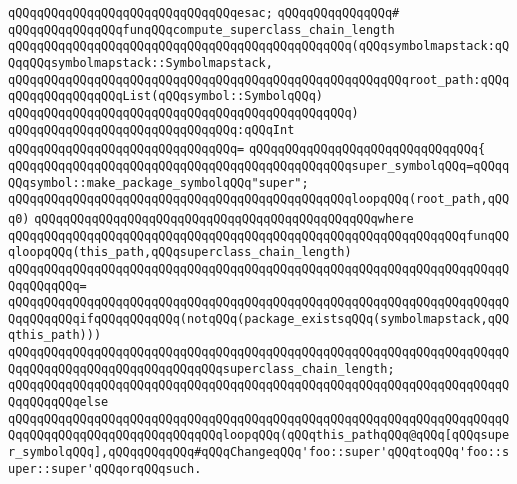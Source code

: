 \verb|qQQqqQQqqQQqqQQqqQQqqQQqqQQqqQQqesac;|\newline
\newline
\verb|qQQqqQQqqQQqqQQq#|\newline
\verb|qQQqqQQqqQQqqQQqfunqQQqcompute_superclass_chain_length|\newline
\verb|qQQqqQQqqQQqqQQqqQQqqQQqqQQqqQQqqQQqqQQqqQQqqQQq(qQQqsymbolmapstack:qQQqqQQqsymbolmapstack::Symbolmapstack,|\newline
\verb|qQQqqQQqqQQqqQQqqQQqqQQqqQQqqQQqqQQqqQQqqQQqqQQqqQQqqQQqroot_path:qQQqqQQqqQQqqQQqqQQqList(qQQqsymbol::SymbolqQQq)|\newline
\verb|qQQqqQQqqQQqqQQqqQQqqQQqqQQqqQQqqQQqqQQqqQQqqQQq)|\newline
\verb|qQQqqQQqqQQqqQQqqQQqqQQqqQQqqQQq:qQQqInt|\newline
\verb|qQQqqQQqqQQqqQQqqQQqqQQqqQQqqQQq=|\newline
\verb|qQQqqQQqqQQqqQQqqQQqqQQqqQQqqQQq{|\newline
\verb|qQQqqQQqqQQqqQQqqQQqqQQqqQQqqQQqqQQqqQQqqQQqqQQqsuper_symbolqQQq=qQQqqQQqsymbol::make_package_symbolqQQq"super";|\newline
\newline
\verb|qQQqqQQqqQQqqQQqqQQqqQQqqQQqqQQqqQQqqQQqqQQqqQQqloopqQQq(root_path,qQQq0)|\newline
\verb|qQQqqQQqqQQqqQQqqQQqqQQqqQQqqQQqqQQqqQQqqQQqqQQqwhere|\newline
\verb|qQQqqQQqqQQqqQQqqQQqqQQqqQQqqQQqqQQqqQQqqQQqqQQqqQQqqQQqqQQqqQQqfunqQQqloopqQQq(this_path,qQQqsuperclass_chain_length)|\newline
\verb|qQQqqQQqqQQqqQQqqQQqqQQqqQQqqQQqqQQqqQQqqQQqqQQqqQQqqQQqqQQqqQQqqQQqqQQqqQQqqQQq=|\newline
\verb|qQQqqQQqqQQqqQQqqQQqqQQqqQQqqQQqqQQqqQQqqQQqqQQqqQQqqQQqqQQqqQQqqQQqqQQqqQQqqQQqifqQQqqQQqqQQq(notqQQq(package_existsqQQq(symbolmapstack,qQQqthis_path)))|\newline
\newline
\verb|qQQqqQQqqQQqqQQqqQQqqQQqqQQqqQQqqQQqqQQqqQQqqQQqqQQqqQQqqQQqqQQqqQQqqQQqqQQqqQQqqQQqqQQqqQQqqQQqqQQqsuperclass_chain_length;|\newline
\verb|qQQqqQQqqQQqqQQqqQQqqQQqqQQqqQQqqQQqqQQqqQQqqQQqqQQqqQQqqQQqqQQqqQQqqQQqqQQqqQQqelse|\newline
\verb|qQQqqQQqqQQqqQQqqQQqqQQqqQQqqQQqqQQqqQQqqQQqqQQqqQQqqQQqqQQqqQQqqQQqqQQqqQQqqQQqqQQqqQQqqQQqqQQqqQQqloopqQQq(qQQqthis_pathqQQq@qQQq[qQQqsuper_symbolqQQq],qQQqqQQqqQQq#qQQqChangeqQQq'foo::super'qQQqtoqQQq'foo::super::super'qQQqorqQQqsuch.|\newline
